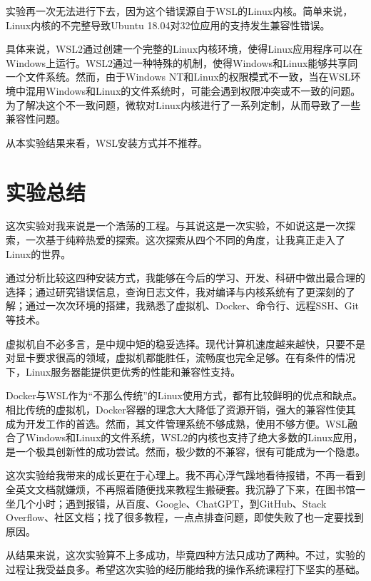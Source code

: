 \documentclass{article}
\begin{document}
实验再一次无法进行下去，因为这个错误源自于WSL的Linux内核。简单来说，Linux内核的不完整导致Ubuntu 18.04对32位应用的支持发生兼容性错误。

具体来说，WSL2通过创建一个完整的Linux内核环境，使得Linux应用程序可以在Windows上运行。WSL2通过一种特殊的机制，使得Windows和Linux能够共享同一个文件系统。然而，由于Windows NT和Linux的权限模式不一致，当在WSL环境中混用Windows和Linux的文件系统时，可能会遇到权限冲突或不一致的问题。为了解决这个不一致问题，微软对Linux内核进行了一系列定制，从而导致了一些兼容性问题。

从本实验结果来看，WSL安装方式并不推荐。

\normalsize

\section{实验总结}

这次实验对我来说是一个浩荡的工程。与其说这是一次实验，不如说这是一次探索，一次基于纯粹热爱的探索。这次探索从四个不同的角度，让我真正走入了Linux的世界。

通过分析比较这四种安装方式，我能够在今后的学习、开发、科研中做出最合理的选择；通过研究错误信息，查询日志文件，我对编译与内核系统有了更深刻的了解；通过一次次环境的搭建，我熟悉了虚拟机、Docker、命令行、远程SSH、Git等技术。

虚拟机自不必多言，是中规中矩的稳妥选择。现代计算机速度越来越快，只要不是对显卡要求很高的领域，虚拟机都能胜任，流畅度也完全足够。在有条件的情况下，Linux服务器能提供更优秀的性能和兼容性支持。

Docker与WSL作为“不那么传统”的Linux使用方式，都有比较鲜明的优点和缺点。相比传统的虚拟机，Docker容器的理念大大降低了资源开销，强大的兼容性使其成为开发工作的首选。然而，其文件管理系统不够成熟，使用不够方便。WSL融合了Windows和Linux的文件系统，WSL2的内核也支持了绝大多数的Linux应用，是一个极具创新性的成功尝试。然而，极少数的不兼容，很有可能成为一个隐患。

这次实验给我带来的成长更在于心理上。我不再心浮气躁地看待报错，不再一看到全英文文档就嫌烦，不再照着随便找来教程生搬硬套。我沉静了下来，在图书馆一坐几个小时；遇到报错，从百度、Google、ChatGPT，到GitHub、Stack Overflow、社区文档；找了很多教程，一点点排查问题，即使失败了也一定要找到原因。

从结果来说，这次实验算不上多成功，毕竟四种方法只成功了两种。不过，实验的过程让我受益良多。希望这次实验的经历能给我的操作系统课程打下坚实的基础。

\normalsize
\end{document}

